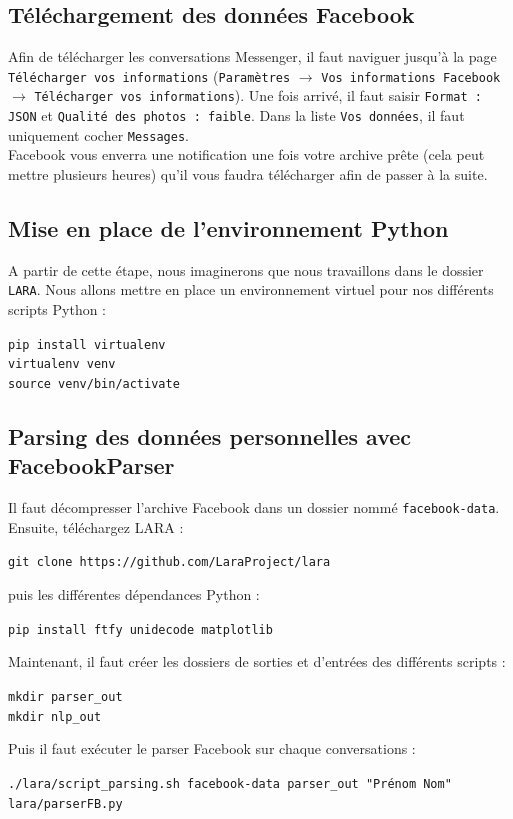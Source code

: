 \documentclass[10pt,a4paper]{article}
\newcommand\tab[1][0.5cm]{\hspace*{#1}}
\begin{document}
\subsection{Téléchargement des données Facebook}
Afin de télécharger les conversations Messenger, il faut naviguer jusqu'à la page \texttt{Télécharger vos informations} (\texttt{Paramètres} $\longrightarrow$ \texttt{Vos informations Facebook} $\longrightarrow$ \texttt{Télécharger vos informations}). Une fois arrivé, il faut saisir \texttt{Format : JSON} et \texttt{Qualité des photos : faible}. Dans la liste \texttt{Vos données}, il faut uniquement cocher \texttt{Messages}. \\
\tab Facebook vous enverra une notification une fois votre archive prête (cela peut mettre plusieurs heures) qu'il vous faudra télécharger afin de passer à la suite.
\subsection{Mise en place de l'environnement Python}
A partir de cette étape, nous imaginerons que nous travaillons dans le dossier \texttt{LARA}. Nous allons mettre en place un environnement virtuel pour nos différents scripts Python :
\begin{center}
\texttt{pip install virtualenv} \\
\texttt{virtualenv venv} \\
\texttt{source venv/bin/activate}
\end{center}
\subsection{Parsing des données personnelles avec FacebookParser}
Il faut décompresser l'archive Facebook dans un dossier nommé \texttt{facebook-data}. Ensuite, téléchargez LARA :
\begin{center}
\texttt{git clone https://github.com/LaraProject/lara}
\end{center}
puis les différentes dépendances Python :
\begin{center}
\texttt{pip install ftfy unidecode matplotlib}
\end{center}
Maintenant, il faut créer les dossiers de sorties et d'entrées des différents scripts :
\begin{center}
\texttt{mkdir parser\_out} \\
\texttt{mkdir nlp\_out}
\end{center}
Puis il faut exécuter le parser Facebook sur chaque conversations :
\begin{center}
\texttt{./lara/script\_parsing.sh facebook-data parser\_out "Prénom Nom" lara/parserFB.py}
\end{center}
\end{document}
